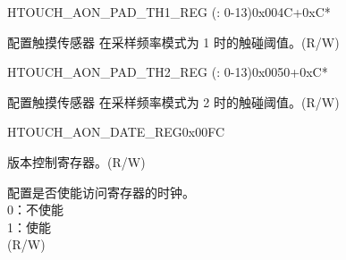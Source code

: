 \begin{register}{H}{TOUCH\_AON\_PAD\_TH1\_REG (: 0-13)}{0x004C+0xC*}\label{regdesc:TOUCHAONPADNTH1REG}
%
%
\regnewline%
\begin{regdesc}\begin{reglist}
\label{fielddesc:TOUCHAONTOUCHPAD0TH1}\item [TOUCH\_AON\_TOUCH\_PAD\regindex{n}\_TH1] 配置触摸传感器  在采样频率模式为 1 时的触碰阈值。(R/W)
\end{reglist}\end{regdesc}
\end{register}


\begin{register}{H}{TOUCH\_AON\_PAD\_TH2\_REG (: 0-13)}{0x0050+0xC*}\label{regdesc:TOUCHAONPADNTH2REG}
%
%
\regnewline%
\begin{regdesc}\begin{reglist}
\label{fielddesc:TOUCHAONTOUCHPAD0TH2}\item [TOUCH\_AON\_TOUCH\_PAD\regindex{n}\_TH2] 配置触摸传感器  在采样频率模式为 2 时的触碰阈值。(R/W)
\end{reglist}\end{regdesc}
\end{register}


\begin{register}{H}{TOUCH\_AON\_DATE\_REG}{0x00FC}\label{regdesc:TOUCHAONDATEREG}
%
%
\regnewline%
\begin{regdesc}\begin{reglist}
\label{fielddesc:TOUCHAONDATE}\item [TOUCH\_AON\_DATE] 版本控制寄存器。(R/W)
\label{fielddesc:TOUCHAONCLKEN}\item [TOUCH\_AON\_CLK\_EN] 配置是否使能访问寄存器的时钟。\\
0：不使能\\
1：使能\\
(R/W)
\end{reglist}\end{regdesc}
\end{register}
